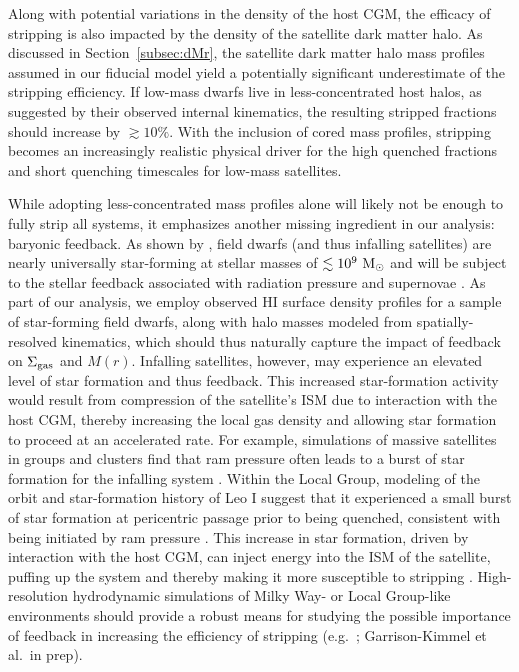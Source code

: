 \documentclass[usenatbib]{mn2e}
\newcommand{\msun}{{\rm M}_{\odot}}
\begin{document}
Along with potential variations in the density of the host CGM, the
efficacy of stripping is also impacted by the density of the satellite
dark matter halo.
%
As discussed in Section~\ref{subsec:dMr}, the satellite dark matter
halo mass profiles assumed in our fiducial model yield a potentially
significant underestimate of the stripping efficiency.
%
If low-mass dwarfs live in less-concentrated host halos, as suggested
by their observed internal kinematics, the resulting stripped
fractions should increase by $\gtrsim 10\%$. 
%
With the inclusion of cored mass profiles, stripping becomes an
increasingly realistic physical driver for the high quenched fractions
and short quenching timescales for low-mass satellites. 


While adopting less-concentrated mass profiles alone will likely not
be enough to fully strip all systems, it emphasizes another missing
ingredient in our analysis: baryonic feedback.
%
As shown by \citet{geha12}, field dwarfs (and thus infalling
satellites) are nearly universally star-forming at stellar masses of
$\lesssim10^{9}~\msun$ and will be subject to the stellar feedback
associated with radiation pressure and supernovae \citep[e.g][]{mqt05,
  hopkins14}.
%
As part of our analysis, we employ observed H{\scriptsize I} surface
density profiles for a sample of star-forming field dwarfs, along with
halo masses modeled from spatially-resolved kinematics, which should
thus naturally capture the impact of feedback on $\Sigma_{\rm gas}$
and $M(r)$.
%
Infalling satellites, however, may experience an elevated level of
star formation and thus feedback. 
%
This increased star-formation activity would result from compression
of the satellite's ISM due to interaction with the host CGM, thereby
increasing the local gas density and allowing star formation to
proceed at an accelerated rate.
%
For example, simulations of massive satellites in groups and clusters
find that ram pressure often leads to a burst of star formation for
the infalling system \citep{fujita99, bekki03, bekki14}.
%
Within the Local Group, modeling of the orbit and star-formation
history of Leo I suggest that it experienced a small burst of star
formation at pericentric passage prior to being quenched, consistent
with being initiated by ram pressure \citep{sohn13, bk13,
  weisz14a}.
%
%
This increase in star formation, driven by interaction with the host
CGM, can inject energy into the ISM of the satellite, puffing up the
system and thereby making it more susceptible to stripping
\citep[][but see also \citealt{emerick16}]{stinson07, el15}.
High-resolution hydrodynamic simulations of Milky Way- or Local
Group-like environments should provide a robust means for studying the
possible importance of feedback in increasing the efficiency of
stripping (e.g.~\citealt{zolotov12, mistani16, wetzel16};
Garrison-Kimmel et al.~in prep).
\end{document}
